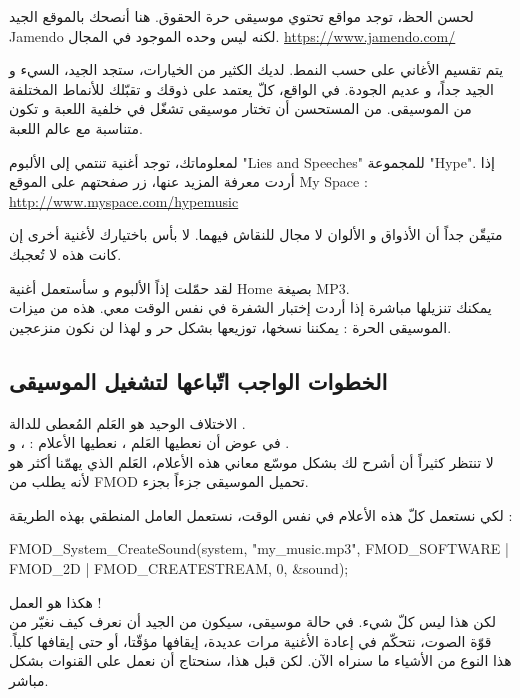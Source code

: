 لحسن الحظ، توجد مواقع تحتوي موسيقى حرة الحقوق. هنا أنصحك بالموقع الجيد
\textenglish{Jamendo}
لكنه ليس وحده الموجود في المجال.
\url{https://www.jamendo.com/}

يتم تقسيم الأغاني على حسب النمط. لديك الكثير من الخيارات، ستجد الجيد، السيء و الجيد جداً، و عديم الجودة. في الواقع، كلّ يعتمد على ذوقك و تقبّلك للأنماط المختلفة من الموسيقى. من المستحسن أن تختار موسيقى تشغّل في خلفية اللعبة و تكون متناسبة مع عالم اللعبة.

لمعلوماتك، توجد أغنية تنتمي إلى الألبوم
"\textenglish{Lies and Speeches}"
للمجموعة
"\textenglish{Hype}".
إذا أردت معرفة المزيد عنها، زر صفحتهم على الموقع
\textenglish{My Space} :
\url{http://www.myspace.com/hypemusic}

\begin{information}
متيقّن جداً أن الأذواق و الألوان لا مجال للنقاش فيهما. لا بأس باختيارك لأغنية أخرى إن كانت هذه لا تُعجبك.
\end{information}

لقد حمّلت إذاً الألبوم و سأستعمل أغنية
\textenglish{Home}
بصيغة
\textenglish{MP3}.\\
يمكنك تنزيلها مباشرة إذا أردت إختبار الشفرة في نفس الوقت معي. هذه من ميزات الموسيقى الحرة : يمكننا نسخها، توزيعها بشكل حر و لهذا لن نكون منزعجين.

\subsection{الخطوات الواجب اتّباعها لتشغيل الموسيقى}

الاختلاف الوحيد هو العَلم المُعطى للدالة
.\\
في عوض أن نعطيها العَلم
،
نعطيها الأعلام :
،  و .\\
لا تنتظر كثيراً أن أشرح لك بشكل موسّع معاني هذه الأعلام، العَلم الذي يهمّنا أكثر هو
لأنه يطلب من
\textenglish{FMOD}
تحميل الموسيقى جزءاً بجزء.

لكي نستعمل كلّ هذه الأعلام في نفس الوقت، نستعمل العامل المنطقي
\InlineCode{|}
بهذه الطريقة :

\begin{Csource}
FMOD_System_CreateSound(system, "my_music.mp3", FMOD_SOFTWARE | FMOD_2D | FMOD_CREATESTREAM, 0, &sound);
\end{Csource}

هكذا هو العمل  !\\
لكن هذا ليس كلّ شيء. في حالة موسيقى، سيكون من الجيد أن نعرف كيف نغيّر من قوّة الصوت، نتحكّم في إعادة الأغنية مرات عديدة، إيقافها مؤقّتا، أو حتى إيقافها كلياً. هذا النوع من الأشياء ما سنراه الآن. لكن قبل هذا، سنحتاج أن نعمل على القنوات بشكل مباشر.

